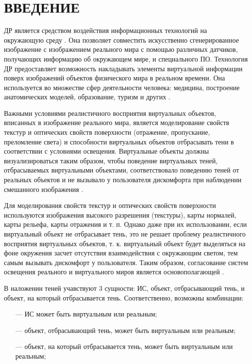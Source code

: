 \chapter*{ВВЕДЕНИЕ}

ДР является средством воздействия информационных технологий на окружающую среду \cite{osti2019real}. Она позволяет совместить искусственно сгенерированное изображение с изображением реального мира с помощью различных датчиков, получающих информацию об окружающем мире, и специального ПО. Технология ДР предоставляет возможность накладывать элементы виртуальной информации поверх изображений объектов физического мира в реальном времени. Она используется во множестве сфер деятельности человека: медицина, построение анатомических моделей, образование, туризм и других \cite{tech-ar}.

Важными условиями реалистичного восприятия виртуальных объектов, вписанных в изображение реального мира, является моделирование свойств текстур и оптических свойств поверхности (отражение, пропускание, преломление света) и способности виртуальных объектов отбрасывать тени в соответствии с условиями освещения. Виртуальные объекты должны визуализироваться таким образом, чтобы поведение виртуальных теней, отбрасываемых виртуальными объектами, соответствовало поведению теней от реальных объектов и не вызывало у пользователя дискомфорта при наблюдении смешанного изображения \cite{bogdanov}. 

Для моделирования свойств текстур и оптических свойств поверхности используются изображения высокого разрешения (текстуры), карты нормалей, карты рельефа, карты отражения и т. п. Однако даже при их использовании, если виртуальный объект не отбрасывает тень, это не решает проблему реалистичного восприятия виртуальных объектов, т. к. виртуальный объект будет выделяться на фоне окружения засчет отсутствия взаимодействия с окружающим светом, тем самым вызывать дискомфорт у пользователя. Таким образом, согласование систем освещения реального и виртуального миров является основополагающей \cite{osti2019real}.

В наложении теней учавствуют 3 сущности: ИС, объект, отбрасывающий тень, и объект, на который отбрасывается тень. Соответственно, возможны комбинации:

\begin{itemize}
	\item[---] ИС может быть виртуальным или реальным;
	\item[---] объект, отбрасывающий тень, может быть виртуальным или реальным;
	\item[---] объект, на который отбрасывается тень, может быть виртуальным или реальным;
\end{itemize}

